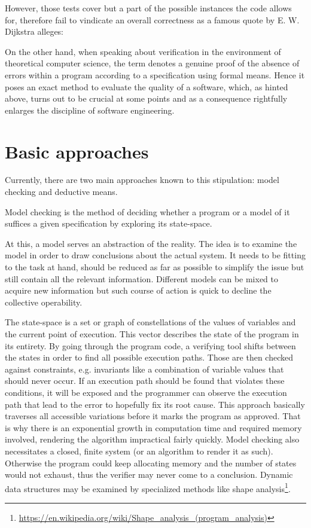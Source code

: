 However, those tests cover but a part of the possible instances the code allows for, therefore fail to vindicate an overall correctness as a famous quote by E. W. Dijkstra alleges:


On the other hand, when speaking about verification in the environment of theoretical computer science, the term denotes a genuine proof of the absence of errors within a program according to a specification using formal means. Hence it poses an exact method to evaluate the quality of a software, which, as hinted above, turns out to be crucial at some points and as a consequence rightfully enlarges the discipline of software engineering.

\section{Basic approaches}
Currently, there are two main approaches known to this stipulation: model checking and deductive means.

Model checking is the method of deciding whether a program or a model of it suffices a given specification by exploring its state-space.

At this, a model serves an abstraction of the reality. The idea is to examine the model in order to draw conclusions about the actual system. It needs to be fitting to the task at hand, should be reduced as far as possible to simplify the issue but still contain all the relevant information. Different models can be mixed to acquire new information but such course of action is quick to decline the collective operability.

The state-space is a set or graph of constellations of the values of variables and the current point of execution. This vector describes the state of the program in its entirety. By going through the program code, a verifying tool shifts between the states in order to find all possible execution paths. Those are then checked against constraints, e.g. invariants like a combination of variable values that should never occur. If an execution path should be found that violates these conditions, it will be exposed and the programmer can observe the execution path that lead to the error to hopefully fix its root cause. This approach basically traverses all accessible variations before it marks the program as approved. That is why there is an exponential growth in computation time and required memory involved, rendering the algorithm impractical fairly quickly. Model checking also necessitates a closed, finite system (or an algorithm to render it as such). Otherwise the program could keep allocating memory and the number of states would not exhaust, thus the verifier may never come to a conclusion. Dynamic data structures may be examined by specialized methods like shape analysis\footnote{\url{https://en.wikipedia.org/wiki/Shape_analysis_(program_analysis)}}.

